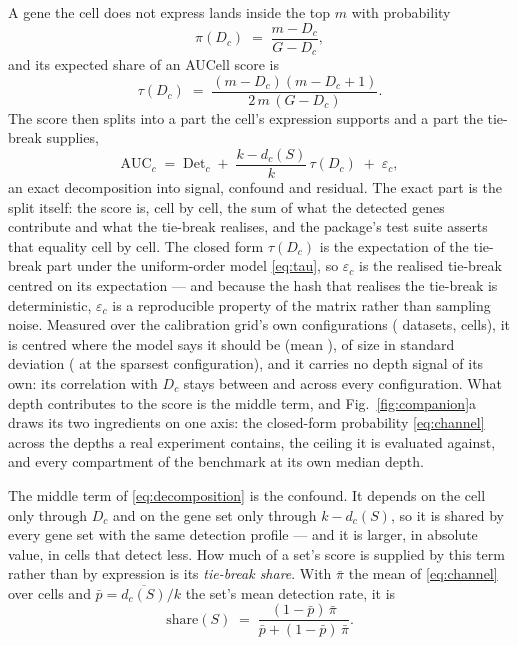 \documentclass[11pt]{article}
\begin{document}
A gene the cell does not express lands inside the top $m$ with probability
\begin{equation}
\pi(D_c) \;=\; \frac{m-D_c}{G-D_c},
\label{eq:channel}
\end{equation}
and its expected share of an AUCell score is
\begin{equation}
\tau(D_c) \;=\; \frac{(m-D_c)(m-D_c+1)}{2\,m\,(G-D_c)} .
\label{eq:tau}
\end{equation}
The score then splits into a part the cell's expression supports and a part
the tie-break supplies,
\begin{equation}
\mathrm{AUC}_c \;=\; \mathrm{Det}_c \;+\; \frac{k-d_c(S)}{k}\,\tau(D_c)
\;+\; \varepsilon_c ,
\label{eq:decomposition}
\end{equation}
an exact decomposition into signal, confound and residual. The exact part is
the split itself: the score is, cell by cell, the sum of what the detected
genes contribute and what the tie-break realises, and the package's test
suite asserts that equality cell by cell. The closed form $\tau(D_c)$ is the
expectation of the tie-break part under the uniform-order model
\eqref{eq:tau}, so $\varepsilon_c$ is the realised tie-break centred on its
expectation --- and because the hash that realises the tie-break is
deterministic, $\varepsilon_c$ is a reproducible property of the matrix
rather than sampling noise. Measured over the calibration grid's own
configurations (\residNDatasets{} datasets, \residNCells{} cells), it is
centred where the model says it should be (mean \residMean), of size
\residSdMedian{} in standard deviation (\residSdMax{} at the sparsest
configuration), and it carries no depth signal of its own: its correlation
with $D_c$ stays between \residCorrMin{} and \residCorrMax{} across every
configuration. What depth contributes to the score is the middle term, and
Fig.~\ref{fig:companion}a draws its two ingredients on one axis: the
closed-form probability \eqref{eq:channel} across the depths a real
experiment contains, the ceiling it is evaluated against, and every
compartment of the benchmark at its own median depth.

The middle term of \eqref{eq:decomposition} is the confound. It depends on the
cell only through $D_c$ and on the gene set only through $k-d_c(S)$, so it
is shared by every gene set with the same detection profile --- and it is
larger, in absolute value, in cells that detect less. How much of a set's score
is supplied by this term rather than by expression is its \emph{tie-break
share}. With $\bar\pi$ the mean of \eqref{eq:channel} over cells and
$\bar p=\overline{d_c(S)}/k$ the set's mean detection rate, it is
\begin{equation}
\mathrm{share}(S) \;=\; \frac{(1-\bar p)\,\bar\pi}{\bar p+(1-\bar p)\,\bar\pi} .
\label{eq:share}
\end{equation}
\end{document}
